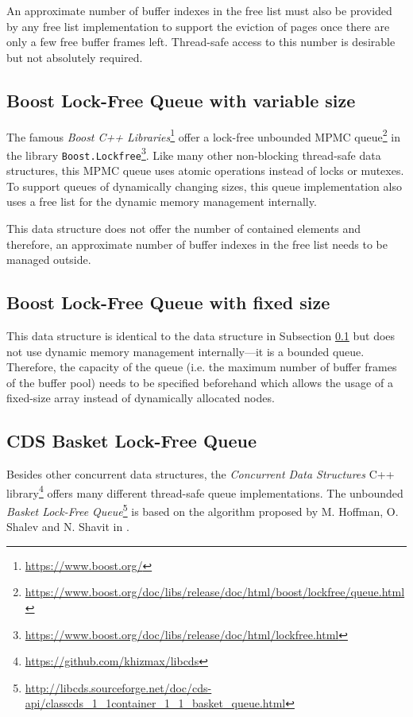 	An approximate number of buffer indexes in the free list must also be provided by any free list implementation to support the eviction of pages once there are only a few free buffer frames left. Thread-safe access to this number is desirable but not absolutely required.

\subsection[Boost Lock-Free Queue with variable size]{Boost Lock-Free Queue with variable size} \label{subsec:boost}

	The famous \textit{Boost C++ Libraries}\footnote{\url{https://www.boost.org/}} offer a lock-free unbounded MPMC queue\footnote{\url{https://www.boost.org/doc/libs/release/doc/html/boost/lockfree/queue.html}} in the library \lstinline{Boost.Lockfree}\footnote{\url{https://www.boost.org/doc/libs/release/doc/html/lockfree.html}}. Like many other non-blocking thread-safe data structures, this MPMC queue uses atomic operations instead of locks or mutexes. To support queues of dynamically changing sizes, this queue implementation also uses a free list for the dynamic memory management internally.
	
	This data structure does not offer the number of contained elements and therefore, an approximate number of buffer indexes in the free list needs to be managed outside.

\subsection[Boost Lock-Free Queue with fixed size]{Boost Lock-Free Queue with fixed size} \label{subsec:boost-fixed}

	This data structure is identical to the data structure in Subsection \ref{subsec:boost} but does not use dynamic memory management internally---it is a bounded queue. Therefore, the capacity of the queue (i.e. the maximum number of buffer frames of the buffer pool) needs to be specified beforehand which allows the usage of a fixed-size array instead of dynamically allocated nodes.

\subsection[CDS BasketQueue]{CDS Basket Lock-Free Queue} \label{subsec:cds-basket}

	Besides other concurrent data structures, the \textit{Concurrent Data Structures} C++ library\footnote{\url{https://github.com/khizmax/libcds}} offers many different thread-safe queue implementations. The unbounded \emph{Basket Lock-Free Queue}\footnote{\url{http://libcds.sourceforge.net/doc/cds-api/classcds\_1\_1container\_1\_1\_basket\_queue.html}} is based on the algorithm proposed by M. Hoffman, O. Shalev and N. Shavit in \cite{Hoffman:2007}.
	
